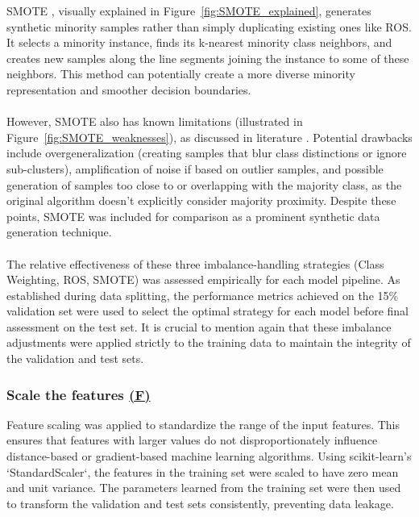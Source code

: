 \documentclass[12pt,a4paper]{report}
\begin{document}
\noindent
SMOTE \cite{Chawla2002SMOTE}, visually explained in Figure~\ref{fig:SMOTE_explained}, generates synthetic minority samples rather than simply duplicating existing ones like ROS. It selects a minority instance, finds its k-nearest minority class neighbors, and creates new samples along the line segments joining the instance to some of these neighbors. This method can potentially create a more diverse minority representation and smoother decision boundaries.\\
\\
However, SMOTE also has known limitations (illustrated in Figure~\ref{fig:SMOTE_weaknesses}), as discussed in literature \cite{Truong2022SMOTEVariants}. Potential drawbacks include overgeneralization (creating samples that blur class distinctions or ignore sub-clusters), amplification of noise if based on outlier samples, and possible generation of samples too close to or overlapping with the majority class, as the original algorithm doesn't explicitly consider majority proximity. Despite these points, SMOTE was included for comparison as a prominent synthetic data generation technique.\\
\\
The relative effectiveness of these three imbalance-handling strategies (Class Weighting, ROS, SMOTE) was assessed empirically for each model pipeline. As established during data splitting, the performance metrics achieved on the 15\% validation set were used to select the optimal strategy for each model before final assessment on the test set. It is crucial to mention again that these imbalance adjustments were applied strictly to the training data to maintain the integrity of the validation and test sets.


\subsubsection*{Scale the features \hyperref[fig:pipeline-1]{(F)}}
Feature scaling was applied to standardize the range of the input features. This ensures that features with larger values do not disproportionately influence distance-based or gradient-based machine learning algorithms. Using scikit-learn's `StandardScaler`, the features in the training set were scaled to have zero mean and unit variance. The parameters learned from the training set were then used to transform the validation and test sets consistently, preventing data leakage.
\end{document}
